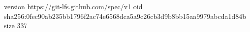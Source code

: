 version https://git-lfs.github.com/spec/v1
oid sha256:0fec90ab235bb1796f2ac74e6568dca5a9c26cb3d9b8bb15aa9979abcda1d84b
size 337

